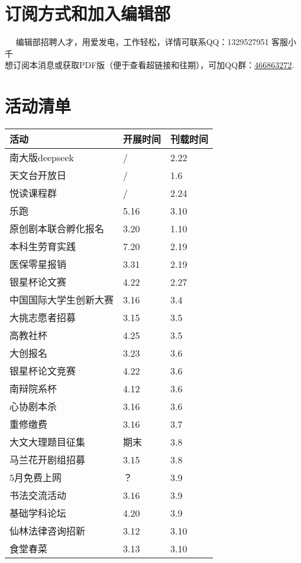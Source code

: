\documentclass[letterpaper, 12pt]{article}
\begin{document}
\begin{multicols}{2}
\section{订阅方式和加入编辑部}  
编辑部招聘人才，用爱发电，工作轻松，详情可联系QQ：1329527951 客服小千\\想订阅本消息或获取PDF版（便于查看超链接和往期），可加QQ群：\href{https://qm.qq.com/q/4HL41Nt3sQ}{466863272}.
\section{活动清单}
\begin{tabular}{|>{\centering\arraybackslash}m{}|m{}|m{}|}
    \hline
    活动 & 开展时间 & 刊载时间\\
    \hline\hline
    南大版deepseek & / & 2.22\\
    天文台开放日 & / & 1.6\\
    悦读课程群 & / & 2.24\\
    乐跑 & 5.16 & 3.10\\
    原创剧本联合孵化报名 & 3.20 & 1.10\\
    本科生劳育实践 & 7.20 & 2.19\\
    医保零星报销 & 3.31 & 2.19\\
    银星杯论文赛 & 4.22 & 2.27\\
    中国国际大学生创新大赛 & 3.16 & 3.4\\
    大挑志愿者招募 & 3.15 & 3.5\\
    高教社杯 & 4.25 & 3.5\\
    大创报名 & 3.23 & 3.6\\
    银星杯论文竞赛 & 4.22 & 3.6\\
    南辩院系杯 & 4.12 & 3.6\\
    心协剧本杀 & 3.16 & 3.6\\
    重修缴费 & 3.16 & 3.7\\
    大文大理题目征集 & 期末 & 3.8\\
    马兰花开剧组招募 & 3.15 & 3.8\\
    5月免费上网 & ？ & 3.9\\
    书法交流活动 & 3.16 & 3.9\\
    基础学科论坛 & 4.20 & 3.9\\
    仙林法律咨询招新 & 3.12 & 3.10\\
    食堂春菜 & 3.13 & 3.10\\
    \hline
\end{tabular}



\end{multicols}
\end{document}
